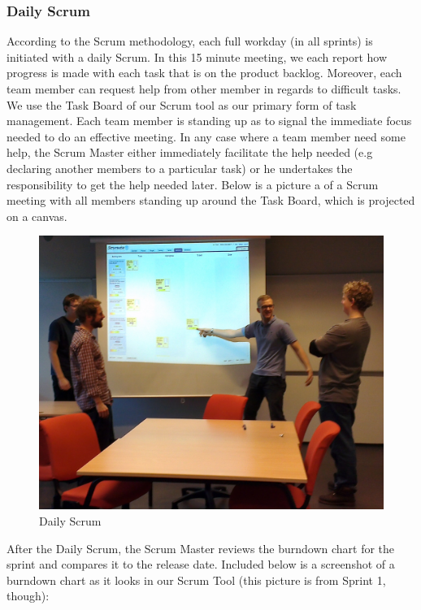 \subsubsection{Daily Scrum}
According to the Scrum methodology, each full workday (in all sprints) is initiated with a daily Scrum. In this 15 minute meeting, we each report how progress is made with each task that is on the product backlog. Moreover, each team member can request help from other member in regards to difficult tasks. We use the Task Board of our Scrum tool as our primary form of task management. Each team member is standing up as to signal the immediate focus needed to do an effective meeting. In any case where a team member need some help, the Scrum Master either immediately facilitate the help needed (e.g declaring another members to a particular task) or he undertakes the responsibility to get the help needed later. Below is a picture a of a Scrum meeting with all members standing up around the Task Board, which is projected on a canvas.\\
\begin{figure}[H]
  \includegraphics[width=\textwidth,natwidth=1696,natheight=1349]{illustrations/Daily.jpg}
  \caption{Daily Scrum}
  \label{dailyscrum}
\end{figure}
After the Daily Scrum, the Scrum Master reviews the burndown chart for the sprint and compares it to the release date. Included below is a screenshot of a burndown chart as it looks in our Scrum Tool (this picture is from Sprint 1, though):\\
